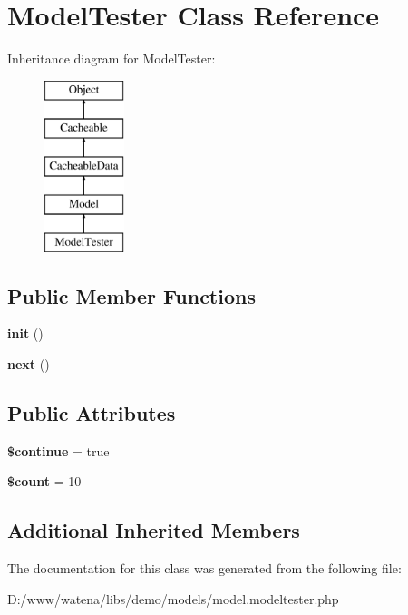 \hypertarget{class_model_tester}{\section{Model\-Tester Class Reference}
\label{class_model_tester}
}
Inheritance diagram for Model\-Tester\-:\begin{figure}[H]
\begin{center}
\leavevmode
\includegraphics[height=5.000000cm]{class_model_tester}
\end{center}
\end{figure}
\subsection*{Public Member Functions}
\begin{DoxyCompactItemize}
\item 
\hypertarget{class_model_tester_acb7b9819af84e19c466cc04994b18850}{{\bfseries init} ()}\label{class_model_tester_acb7b9819af84e19c466cc04994b18850}

\item 
\hypertarget{class_model_tester_a113e6cbba2cbc36a1fe69696f34af917}{{\bfseries next} ()}\label{class_model_tester_a113e6cbba2cbc36a1fe69696f34af917}

\end{DoxyCompactItemize}
\subsection*{Public Attributes}
\begin{DoxyCompactItemize}
\item 
\hypertarget{class_model_tester_ad7095b7c308c8639de7879cf26d9a959}{{\bfseries \$continue} = true}\label{class_model_tester_ad7095b7c308c8639de7879cf26d9a959}

\item 
\hypertarget{class_model_tester_a017c191e5d496bfcefc522f07a35e4ca}{{\bfseries \$count} = 10}\label{class_model_tester_a017c191e5d496bfcefc522f07a35e4ca}

\end{DoxyCompactItemize}
\subsection*{Additional Inherited Members}


The documentation for this class was generated from the following file\-:\begin{DoxyCompactItemize}
\item 
D\-:/www/watena/libs/demo/models/model.\-modeltester.\-php\end{DoxyCompactItemize}
